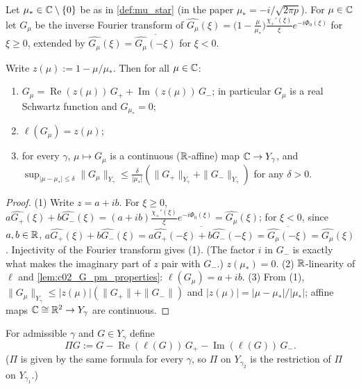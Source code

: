 \begin{definition}
  \label{def:G_mu}
  Let $\mu_*\in\mathbb{C}\setminus\{0\}$ be as in \cref{def:mu_star} (in the paper $\mu_*=-i/\sqrt{2\pi p}$).
  For $\mu\in\mathbb{C}$ let $G_\mu$ be the inverse Fourier transform of
  $\widehat{G_\mu}(\xi)=\bigl(1-\frac{\mu}{\mu_*}\bigr)\frac{\chi_+'(\xi)}{\xi}e^{-i\Phi_0(\xi)}$ for $\xi\ge0$, extended by
  $\widehat{G_\mu}(\xi)=\overline{\widehat{G_\mu}(-\xi)}$ for $\xi<0$.
\end{definition}

\begin{lemma}[Decomposition of $G_\mu$]
  \label{lem:c02_G_mu_decomposition}
  Write $z(\mu):=1-\mu/\mu_*$. Then for all $\mu\in\mathbb{C}$:
  \begin{enumerate}
    \item $G_\mu=\operatorname{Re}(z(\mu))\,G_++\operatorname{Im}(z(\mu))\,G_-$; in particular $G_\mu$ is a real Schwartz
      function and $G_{\mu_*}=0$;
    \item $\ell(G_\mu)=z(\mu)$;
    \item for every $\gamma$, $\mu\mapsto G_\mu$ is a continuous ($\mathbb{R}$-affine) map $\mathbb{C}\to Y_\gamma$, and
      $\sup_{|\mu-\mu_*|\le\delta}\|G_\mu\|_{Y_\gamma}\le\frac{\delta}{|\mu_*|}(\|G_+\|_{Y_\gamma}+\|G_-\|_{Y_\gamma})$ for any $\delta>0$.
  \end{enumerate}
\end{lemma}
\begin{proof}
  (1) Write $z=a+ib$. For $\xi\ge0$,
  $a\widehat{G_+}(\xi)+b\widehat{G_-}(\xi)=(a+ib)\frac{\chi_+'(\xi)}{\xi}e^{-i\Phi_0(\xi)}=\widehat{G_\mu}(\xi)$; for $\xi<0$,
  since $a,b\in\mathbb{R}$, $a\widehat{G_+}(\xi)+b\widehat{G_-}(\xi)=\overline{a\widehat{G_+}(-\xi)+b\widehat{G_-}(-\xi)}=\overline{\widehat{G_\mu}(-\xi)}=\widehat{G_\mu}(\xi)$.
  Injectivity of the Fourier transform gives (1). (The factor $i$ in $G_-$ is exactly what makes
  the imaginary part of $z$ pair with $G_-$.) $z(\mu_*)=0$.
  (2) $\mathbb{R}$-linearity of $\ell$ and \cref{lem:c02_G_pm_properties}: $\ell(G_\mu)=a+ib$.
  (3) From (1), $\|G_\mu\|_{Y_\gamma}\le|z(\mu)|(\|G_+\|+\|G_-\|)$ and $|z(\mu)|=|\mu-\mu_*|/|\mu_*|$; affine maps
  $\mathbb{C}\cong\mathbb{R}^2\to Y_\gamma$ are continuous.
\end{proof}

\begin{definition}
  \label{def:Pi_projection}
  For admissible $\gamma$ and $G\in Y_\gamma$ define
  \[
    \Pi G:=G-\operatorname{Re}(\ell(G))\,G_+-\operatorname{Im}(\ell(G))\,G_- .
  \]
  ($\Pi$ is given by the same formula for every $\gamma$, so $\Pi$ on $Y_{\gamma_2}$ is the restriction of
  $\Pi$ on $Y_{\gamma_1}$.)
\end{definition}

